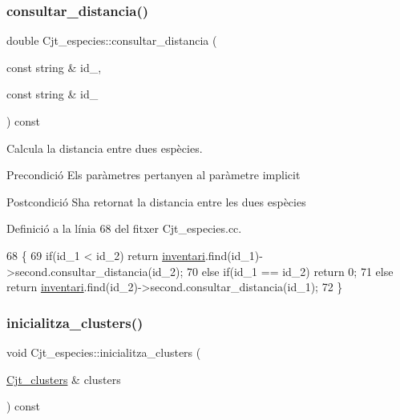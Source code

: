 \subsubsection{\texorpdfstring{consultar\+\_\+distancia()}{consultar\_distancia()}}
{\footnotesize\ttfamily double Cjt\+\_\+especies\+::consultar\+\_\+distancia (\begin{DoxyParamCaption}\item[{const string \&}]{id\+\_,  }\item[{const string \&}]{id\+\_ }\end{DoxyParamCaption}) const}



Calcula la distancia entre dues espècies. 

\begin{DoxyPrecond}{Precondició}
Els paràmetres pertanyen al paràmetre implicit 
\end{DoxyPrecond}
\begin{DoxyPostcond}{Postcondició}
S\textquotesingle{}ha retornat la distancia entre les dues espècies 
\end{DoxyPostcond}


Definició a la línia 68 del fitxer Cjt\+\_\+especies.\+cc.


\begin{DoxyCode}
68                                                                                     \{
69     \textcolor{keywordflow}{if}(id\_1 < id\_2) \textcolor{keywordflow}{return} \hyperlink{class_cjt__especies_aa253bc335c8c8176b8ece5c49a15c5f3}{inventari}.find(id\_1)->second.consultar\_distancia(id\_2);
70     \textcolor{keywordflow}{else} \textcolor{keywordflow}{if}(id\_1 == id\_2) \textcolor{keywordflow}{return} 0;
71     \textcolor{keywordflow}{else} \textcolor{keywordflow}{return} \hyperlink{class_cjt__especies_aa253bc335c8c8176b8ece5c49a15c5f3}{inventari}.find(id\_2)->second.consultar\_distancia(id\_1);
72 \}
\end{DoxyCode}
\mbox{\label{class_cjt__especies_a568357e9132b16cfe7280e29e6e89cfb}} 
\subsubsection{\texorpdfstring{inicialitza\+\_\+clusters()}{inicialitza\_clusters()}}
{\footnotesize\ttfamily void Cjt\+\_\+especies\+::inicialitza\+\_\+clusters (\begin{DoxyParamCaption}\item[{\hyperlink{class_cjt__clusters}{Cjt\+\_\+clusters} \&}]{clusters }\end{DoxyParamCaption}) const}



